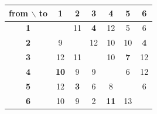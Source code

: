 \begin{tabular}{c|cccccc}
from $\backslash$ to & 1 & 2 & 3 & 4 & 5 & 6\\\hline
\textbf{1} & \cellcolor{black!12} & 11 & \cellcolor{yellow!60}\textbf{4} & 12 & 5 & 6\\
\textbf{2} & 9 & \cellcolor{black!12} & 12 & 10 & 10 & \cellcolor{yellow!60}\textbf{4}\\
\textbf{3} & 12 & 11 & \cellcolor{black!12} & 10 & \cellcolor{yellow!60}\textbf{7} & 12\\
\textbf{4} & \cellcolor{yellow!60}\textbf{10} & 9 & 9 & \cellcolor{black!12} & 6 & 12\\
\textbf{5} & 12 & \cellcolor{yellow!60}\textbf{3} & 6 & 8 & \cellcolor{black!12} & 6\\
\textbf{6} & 10 & 9 & 2 & \cellcolor{yellow!60}\textbf{11} & 13 & \cellcolor{black!12}\\
\end{tabular}
